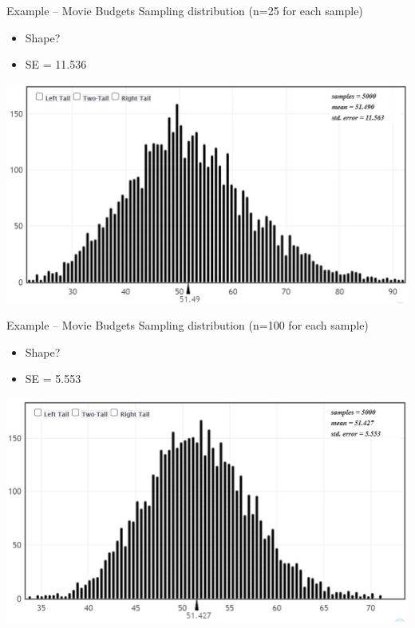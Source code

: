 \documentclass{beamer}
\begin{document}
\begin{frame}{Example -- Movie Budgets}
Sampling distribution (n=25 for each sample)
\begin{itemize}
    \item Shape?
    \item SE = 11.536
\end{itemize}
\begin{center}
    \includegraphics[scale=.6]{img/budgets_n25.jpg}
\end{center}
\end{frame}

\begin{frame}{Example -- Movie Budgets}
Sampling distribution (n=100 for each sample)
\begin{itemize}
    \item Shape?
    \item SE = 5.553
\end{itemize}
\begin{center}
    \includegraphics[scale=.6]{img/budgets_n100.jpg}
\end{center}
\end{frame}
\end{document}

